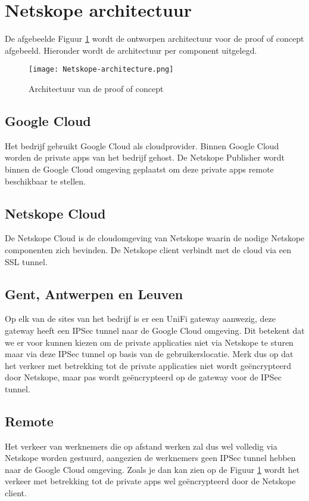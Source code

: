 \section{Netskope architectuur}
De afgebeelde Figuur \ref{fig:poc-architecture} wordt de ontworpen architectuur voor de proof of concept afgebeeld. Hieronder wordt de architectuur per component uitgelegd.
\begin{figure}[h!]
    \centering
    \texttt{[image: Netskope-architecture.png]}
    \caption[]{Architectuur van de proof of concept}
    \label{fig:poc-architecture}
\end{figure}
  
\subsection{Google Cloud}
Het bedrijf gebruikt Google Cloud als cloudprovider. Binnen Google Cloud worden de private apps van het bedrijf gehost. De Netskope Publisher wordt binnen de Google Cloud omgeving geplaatst om deze private apps remote beschikbaar te stellen. 

\subsection{Netskope Cloud}
De Netskope Cloud is de cloudomgeving van Netskope waarin de nodige Netskope componenten zich bevinden. De Netskope client verbindt met de cloud via een SSL tunnel.

\subsection{Gent, Antwerpen en Leuven}
Op elk van de sites van het bedrijf is er een UniFi gateway aanwezig, deze gateway heeft een IPSec tunnel naar de Google Cloud omgeving. Dit betekent dat we er voor kunnen kiezen om de private applicaties niet via Netskope te sturen maar via deze IPSec tunnel op basis van de gebruikerslocatie. Merk dus op dat het verkeer met betrekking tot de private applicaties niet wordt geëncrypteerd door Netskope, maar pas wordt geëncrypteerd op de gateway voor de IPSec tunnel.

\subsection{Remote}
Het verkeer van werknemers die op afstand werken zal dus wel volledig via Netskope worden gestuurd, aangezien de werknemers geen IPSec tunnel hebben naar de Google Cloud omgeving. Zoals je dan kan zien op de Figuur \ref{fig:poc-architecture} wordt het verkeer met betrekking tot de private apps wel geëncrypteerd door de Netskope client.

